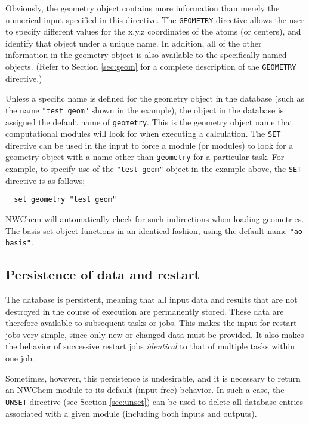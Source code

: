 Obviously, the geometry object contains more information than merely the
numerical input specified in this directive.  The \verb+GEOMETRY+
directive allows the user to specify different values for the x,y,z
coordinates of the atoms (or centers), and identify that object under
a unique name.  In addition, all of the other information in the 
geometry object is also available
to the specifically named objects.  (Refer to Section
\ref{sec:geom} for a complete description of the {\tt GEOMETRY}
directive.)

Unless a specific name is defined for the geometry object in the
database (such as the name \verb+"test geom"+ shown in the
example), the object in the database is assigned the default name of
\verb+geometry+.  This is the geometry object name that computational
modules will look for when executing a calculation.  The {\tt SET}
directive can be used in the input to force a module (or modules) to
look for a geometry object with a name other than \verb+geometry+
for a particular task.  For example, to specify use of the 
\verb+"test geom"+ object in the example above, the \verb+SET+
directive is as follows;

\begin{verbatim}
  set geometry "test geom"
\end{verbatim}

NWChem will automatically check for such indirections when loading
geometries.  The basis set object functions in an identical fashion,
using the default name \verb+"ao basis"+.


\subsection{Persistence of data and restart}
\label{sec:persist}

The database is persistent, meaning that all input data and results
that are not destroyed in the course of execution are permanently
stored.  These data are therefore available to subsequent tasks or
jobs.  This makes the input for restart jobs very simple, since only
new or changed data must be provided.  It also makes the behavior of
successive restart jobs {\em identical} to that of multiple tasks
within one job.  

Sometimes, however, this persistence is undesirable, and it is
necessary to return an NWChem module to its default (input-free)
behavior. In such a case, the \verb+UNSET+ directive (see Section
\ref{sec:unset}) can be used to delete all database entries associated
with a given module (including both inputs and outputs).







